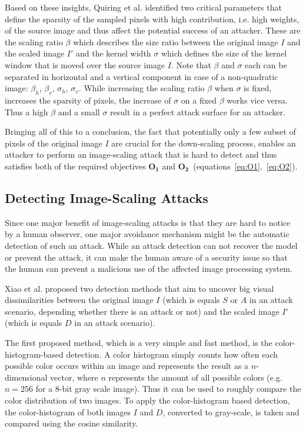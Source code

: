\documentclass[sigconf]{acmart}
\begin{document}
Based on these insights, Quiring et al. identified two critical parameters that define the sparsity of the sampled pixels with high contribution, i.e. high weights, of the source image and thus affect the potential success of an attacker.
These are the scaling ratio $\beta$ which describes the size ratio between the original image $I$ and the scaled image $I'$ and the kernel width $\sigma$ which defines the size of the kernel window that is moved over the source image $I$.
Note that $\beta$ and $\sigma$ each can be separated in horizontal and a vertical component in case of a non-quadratic image: ${\beta}_h$, ${\beta}_v$, ${\sigma}_h$, ${\sigma}_v$.
While increasing the scaling ratio $\beta$ when $\sigma$ is fixed, increases the sparsity of pixels, the increase of $\sigma$ on a fixed $\beta$ works vice versa.
Thus a high $\beta$ and a small $\sigma$ result in a perfect attack surface for an attacker. 

Bringing all of this to a conclusion, the fact that potentially only a few subset of pixels of the original image $I$ are crucial for the down-scaling process, enables an attacker to perform an image-scaling attack that is hard to detect and thus satisfies both of the required objectives $\boldsymbol{O_1}$ and $\boldsymbol{O_2}$~(equations~\ref{eq:O1},~\ref{eq:O2}).

\subsection{Detecting Image-Scaling Attacks}
\label{sec:detection}
Since one major benefit of image-scaling attacks is that they are hard to notice by a human observer, one major avoidance mechanism might be the automatic detection of such an attack.
While an attack detection can not recover the model or prevent the attack, it can make the human aware of a security issue so that the human can prevent a malicious use of the affected image processing system.

Xiao et al.\cite{camouflage} proposed two detection methods that aim to uncover big visual dissimilarities between the original image $I$ (which is equals $S$ or $A$ in an attack scenario, depending whether there is an attack or not) and the scaled image $I'$ (which is equals $D$ in an attack scenario).

The first proposed method, which is a very simple and fast method, is the color-histogram-based detection.
A color histogram simply counts how often each possible color occurs within an image and represents the result as a $n$-dimensional vector, where $n$ represents the amount of all possible colors (e.g. $n = 256$ for a $8$-bit gray scale image).
Thus it can be used to roughly compare the color distribution of two images.
To apply the color-histogram based detection, the color-histogram of both images $I$ and $D$, converted to gray-scale, is taken and compared using the cosine similarity.
\end{document}
